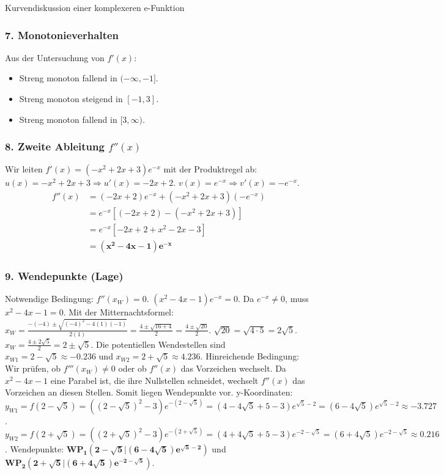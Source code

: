 \begin{loesungsumgebung}{Kurvendiskussion einer komplexeren e-Funktion}
\subsubsection*{7. Monotonieverhalten}
Aus der Untersuchung von $f'(x)$:
\begin{itemize}
    \item Streng monoton fallend in $(-\infty, -1]$.
    \item Streng monoton steigend in $[-1, 3]$.
    \item Streng monoton fallend in $[3, \infty)$.
\end{itemize}

\subsubsection*{8. Zweite Ableitung $f''(x)$}
Wir leiten $f'(x) = (-x^2 + 2x + 3)e^{-x}$ mit der Produktregel ab:
$u(x) = -x^2+2x+3 \Rightarrow u'(x) = -2x+2$.
$v(x) = e^{-x} \Rightarrow v'(x) = -e^{-x}$.
\begin{align*}
f''(x) &= (-2x+2)e^{-x} + (-x^2+2x+3)(-e^{-x}) \\
       &= e^{-x} [(-2x+2) - (-x^2+2x+3)] \\
       &= e^{-x} [-2x+2 + x^2-2x-3] \\
       &= \mathbf{(x^2 - 4x - 1)e^{-x}}
\end{align*}

\subsubsection*{9. Wendepunkte (Lage)}
Notwendige Bedingung: $f''(x_W)=0$.
$(x^2 - 4x - 1)e^{-x} = 0$.
Da $e^{-x} \neq 0$, muss $x^2 - 4x - 1 = 0$.
Mit der Mitternachtsformel: $x_W = \frac{-(-4) \pm \sqrt{(-4)^2 - 4(1)(-1)}}{2(1)} = \frac{4 \pm \sqrt{16+4}}{2} = \frac{4 \pm \sqrt{20}}{2}$.
$\sqrt{20} = \sqrt{4 \cdot 5} = 2\sqrt{5}$.
$x_W = \frac{4 \pm 2\sqrt{5}}{2} = 2 \pm \sqrt{5}$.
Die potentiellen Wendestellen sind $x_{W1} = 2 - \sqrt{5} \approx -0.236$ und $x_{W2} = 2 + \sqrt{5} \approx 4.236$.
Hinreichende Bedingung: Wir prüfen, ob $f'''(x_W) \neq 0$ oder ob $f''(x)$ das Vorzeichen wechselt. Da $x^2-4x-1$ eine Parabel ist, die ihre Nullstellen schneidet, wechselt $f''(x)$ das Vorzeichen an diesen Stellen. Somit liegen Wendepunkte vor.
y-Koordinaten:
$y_{W1} = f(2-\sqrt{5}) = ((2-\sqrt{5})^2-3)e^{-(2-\sqrt{5})} = (4-4\sqrt{5}+5-3)e^{\sqrt{5}-2} = (6-4\sqrt{5})e^{\sqrt{5}-2} \approx -3.727$.
$y_{W2} = f(2+\sqrt{5}) = ((2+\sqrt{5})^2-3)e^{-(2+\sqrt{5})} = (4+4\sqrt{5}+5-3)e^{-2-\sqrt{5}} = (6+4\sqrt{5})e^{-2-\sqrt{5}} \approx 0.216$.
Wendepunkte: $\mathbf{WP_1(2-\sqrt{5} | (6-4\sqrt{5})e^{\sqrt{5}-2})}$ und $\mathbf{WP_2(2+\sqrt{5} | (6+4\sqrt{5})e^{-2-\sqrt{5}})}$.


\end{loesungsumgebung}
